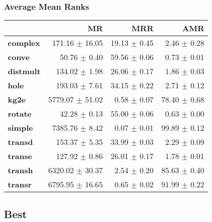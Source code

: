\documentclass{article}
\begin{document}
    \subsubsection{Average Mean Ranks}
    \begin{center}
    \begin{tabular}{lrrr}
\toprule
{} &               MR &           MRR &           AMR \\
\midrule
\textbf{complex } &   171.16 $\pm$ 16.05 &  19.13 $\pm$ 0.45 &   2.46 $\pm$ 0.28 \\
\textbf{conve   } &     50.76 $\pm$ 0.40 &  59.56 $\pm$ 0.06 &   0.73 $\pm$ 0.01 \\
\textbf{distmult} &    134.02 $\pm$ 1.98 &  26.06 $\pm$ 0.17 &   1.86 $\pm$ 0.03 \\
\textbf{hole    } &    193.03 $\pm$ 7.61 &  34.15 $\pm$ 0.22 &   2.71 $\pm$ 0.12 \\
\textbf{kg2e    } &  5779.07 $\pm$ 51.02 &   0.58 $\pm$ 0.07 &  78.40 $\pm$ 0.68 \\
\textbf{rotate  } &     42.28 $\pm$ 0.13 &  55.00 $\pm$ 0.06 &   0.63 $\pm$ 0.00 \\
\textbf{simple  } &   7385.76 $\pm$ 8.42 &   0.07 $\pm$ 0.01 &  99.89 $\pm$ 0.12 \\
\textbf{transd  } &    153.37 $\pm$ 5.35 &  33.99 $\pm$ 0.03 &   2.29 $\pm$ 0.09 \\
\textbf{transe  } &    127.92 $\pm$ 0.86 &  26.01 $\pm$ 0.17 &   1.78 $\pm$ 0.01 \\
\textbf{transh  } &  6320.02 $\pm$ 30.37 &   2.54 $\pm$ 0.20 &  85.63 $\pm$ 0.40 \\
\textbf{transr  } &  6795.95 $\pm$ 16.65 &   0.65 $\pm$ 0.02 &  91.99 $\pm$ 0.22 \\
\bottomrule
\end{tabular}

    \end{center}
    \subsection{Best}
\end{document}
